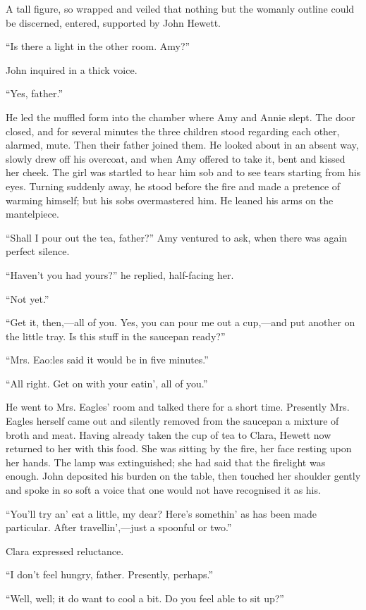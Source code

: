 {}A tall figure, so wrapped and veiled that nothing but the womanly
outline could be discerned, entered, supported by John Hewett.

``Is there a light in the other room. Amy?''

John inquired in a thick voice.

``Yes, father.''

He led the muffled form into the chamber where Amy and Annie slept. The
door closed, and for several minutes the three children stood regarding
each other, alarmed, mute. Then their father joined them. He looked
about in an absent way, slowly drew off his overcoat, and when Amy
offered to take it, bent and kissed her cheek. The girl was startled to
hear him sob and to see tears starting from his eyes. Turning suddenly
away, he stood before the fire and made a pretence of warming himself;
but his sobs overmastered him. He leaned his arms on the mantelpiece.

``Shall I pour out the tea, father?'' Amy ventured to ask, when there
was again perfect silence.

{}``Haven't you had yours?'' he replied, half-facing her.

``Not yet.''

``Get it, then,---all of you. Yes, you can pour me out a cup,---and put
another on the little tray. Is this stuff in the saucepan ready?''

``Mrs. Eao:les said it would be in five minutes.''

``All right. Get on with your eatin', all of you.''

He went to Mrs. Eagles' room and talked there for a short time.
Presently Mrs. Eagles herself came out and silently removed from the
saucepan a mixture of broth and meat. Having already taken the cup of
tea to Clara, Hewett now returned to her with this food. She was sitting
by the fire, her face resting upon her hands. The lamp was extinguished;
she had said that the firelight was enough. John deposited his burden on
the table, then touched her shoulder gently and spoke in so soft a voice
that one would not have recognised it as his.

{}``You'll try an' eat a little, my dear? Here's somethin' as has been
made particular. After travellin',---just a spoonful or two.''

Clara expressed reluctance.

``I don't feel hungry, father. Presently, perhaps.''

``Well, well; it do want to cool a bit. Do you feel able to sit up?''

